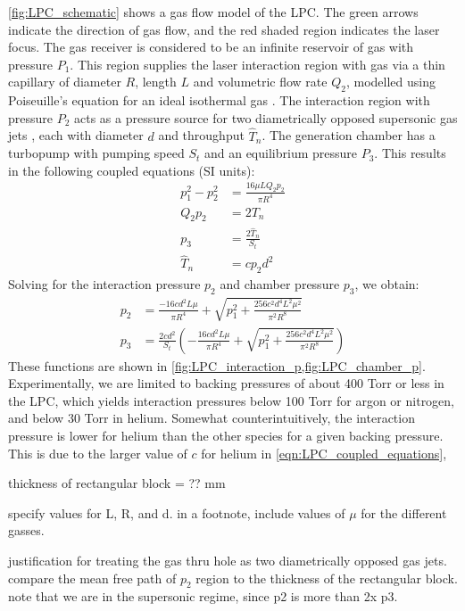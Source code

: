 \cref{fig:LPC_schematic} shows a gas flow model of the LPC. The green arrows indicate the direction of gas flow, and the red shaded region indicates the laser focus. The gas receiver is considered to be an infinite reservoir of gas with pressure $P_1$. This region supplies the laser interaction region with gas via a thin capillary of diameter $R$, length $L$ and volumetric flow rate $Q_2$, modelled using Poiseuille's equation for an ideal isothermal gas \cite{fryerTheoryGasFlow1966,venerusLaminarCapillaryFlow2006}. The interaction region with pressure $P_2$ acts as a pressure source for two diametrically opposed supersonic gas jets \cite{millerFreeJetSources1988}, each with diameter $d$ and throughput $\hat{T}_{n}$. The generation chamber has a turbopump with pumping speed $S_{t}$ and an equilibrium pressure $P_3$. This results in the following coupled equations (SI units):
\begin{align}
p_1^2 - p_2^2 &= \frac{16 \mu L Q_2 p_2}{\pi R^4} \\
Q_2 p_2 &= 2 T_n \\
p_3 &= \frac{2 \hat{T}_n}{S_t} \\
\hat{T}_n &= c p_2 d^2
\label{eqn:LPC_coupled_equations}
\end{align}
Solving for the interaction pressure $p_2$ and chamber pressure $p_3$, we obtain:
\begin{align}
p_2 &= \frac{-16 c d^2 L \mu}{\pi R^4} + \sqrt{p_1^2 + \frac{256 c^2 d^4 L^2 \mu^2}{\pi^2 R^8}} \\
p_3 &= \frac{2 c d^2}{S_t} \left( - \frac{16 c d^2 L \mu}{\pi R^4} + \sqrt{p_1^2 + \frac{256 c^2 d^4 L^2 \mu^2}{\pi^2 R^8}}  \right)
\label{eqn:LPC_pressures}
\end{align}
These functions are shown in \cref{fig:LPC_interaction_p,fig:LPC_chamber_p}. Experimentally, we are limited to backing pressures of about 400 Torr or less in the LPC, which yields interaction pressures below 100 Torr for argon or nitrogen, and below 30 Torr in helium. Somewhat counterintuitively, the interaction pressure is lower for helium than the other species for a given backing pressure. This is due to the larger value of $c$ for helium in \cref{eqn:LPC_coupled_equations}, 


thickness of rectangular block = ?? mm

specify values for L, R, and d. in a footnote, include values of $\mu$ for the different gasses.

justification for treating the gas thru hole as two diametrically opposed gas jets. compare the mean free path of $p_2$ region to the thickness of the rectangular block. note that we are in the supersonic regime, since p2 is more than 2x p3.

